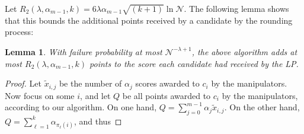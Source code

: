 \documentclass[letterpaper]{article} %
\newtheorem{lemma}[theorem]{Lemma}
\theoremstyle{definition}
\newcommand{\NN}{\mathcal{N}}
\begin{document}
Let $R_2(\lambda, \alpha_{m-1},k)= 6\lambda\alpha_{m-1} \sqrt{(k+1)} \ln \NN $. The following lemma shows that this bounds the additional points received by a candidate by the rounding process:
\begin{lemma}\label{thr:UCM}
	With failure probability at most $\NN^{-\lambda+1}$, the above algorithm adds at most $R_2(\lambda, \alpha_{m-1},k) $ points to the score each candidate had received by the LP.
\end{lemma}
\begin{proof}
Let $\tilde{x}_{i,j}
$ 
be the number of $\alpha_j$ scores awarded to $c_i$ by the manipulators. Now focus on some $i$, and let $Q$ be all points awarded to $c_i$ by the manipulators, according to our algorithm. On one hand, $Q = \sum_{j=0}^{m-1} \alpha_j \tilde{x}_{i,j}$. On the other hand, $Q=\sum_{\ell=1}^{k} \alpha_{\pi_{\ell}(i)}$, and thus


\end{proof}
\end{document}
